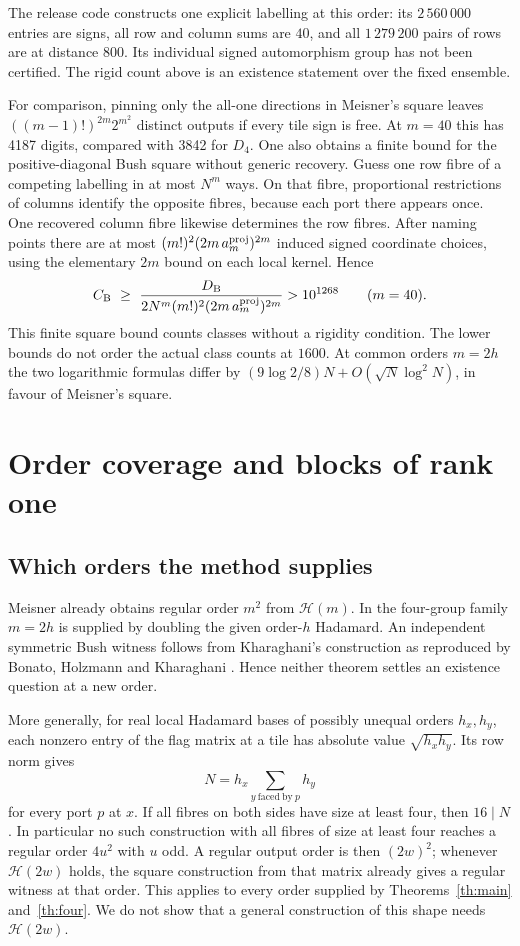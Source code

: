 \documentclass[11pt,reqno]{amsart}
\theoremstyle{remark}\newtheorem{remark}[theorem]{Remark}
\newcommand{\HH}{\mathcal H}
\begin{document}
The release code constructs one explicit labelling at this order: its \(2\,560\,000\) entries are signs, all row and column sums are \(40\), and all \(1\,279\,200\) pairs of rows are at distance \(800\). Its individual signed automorphism group has not been certified. The rigid count above is an existence statement over the fixed ensemble.

For comparison, pinning only the all-one directions in Meisner's square leaves \(((m-1)!)^{2m}2^{m^2}\) distinct outputs if every tile sign is free. At \(m=40\) this has 4187 digits, compared with 3842 for \(D_4\). One also obtains a finite bound for the positive-diagonal Bush square without generic recovery. Guess one row fibre of a competing labelling in at most \(N^m\) ways. On that fibre, proportional restrictions of columns identify the opposite fibres, because each port there appears once. One recovered column fibre likewise determines the row fibres. After naming points there are at most \((m!)^2(2m\,a_m^{\rm proj})^{2m}\) induced signed coordinate choices, using the elementary \(2m\) bound on each local kernel. Hence
\[
 C_{\rm B}\ \ge\ \frac{D_{\rm B}}{2N^m(m!)^2(2m\,a_m^{\rm proj})^{2m}}>10^{1268}
 \qquad(m=40).
\]
This finite square bound counts classes without a rigidity condition. The lower bounds do not order the actual class counts at \(1600\). At common orders \(m=2h\) the two logarithmic formulas differ by \((9\log2/8)N+O(\sqrt N\log^2 N)\), in favour of Meisner's square.
\section{Order coverage and blocks of rank one}
\subsection{Which orders the method supplies}
Meisner already obtains regular order \(m^2\) from \(\HH(m)\). In the four-group family \(m=2h\) is supplied by doubling the given order-\(h\) Hadamard. An independent symmetric Bush witness follows from Kharaghani's construction as reproduced by Bonato, Holzmann and Kharaghani \cite[Theorem~1]{bhk}. Hence neither theorem settles an existence question at a new order.

More generally, for real local Hadamard bases of possibly unequal orders \(h_x,h_y\), each nonzero entry of the flag matrix at a tile has absolute value \(\sqrt{h_xh_y}\). Its row norm gives
\[
 N=h_x\sum_{y\ \mathrm{faced\ by}\ p}h_y
\]
for every port \(p\) at \(x\). If all fibres on both sides have size at least four, then \(16\mid N\). In particular no such construction with all fibres of size at least four reaches a regular order \(4u^2\) with \(u\) odd. A regular output order is then \((2w)^2\); whenever \(\HH(2w)\) holds, the square construction from that matrix already gives a regular witness at that order. This applies to every order supplied by Theorems~\ref{th:main} and~\ref{th:four}. We do not show that a general construction of this shape needs \(\HH(2w)\).
\end{document}

